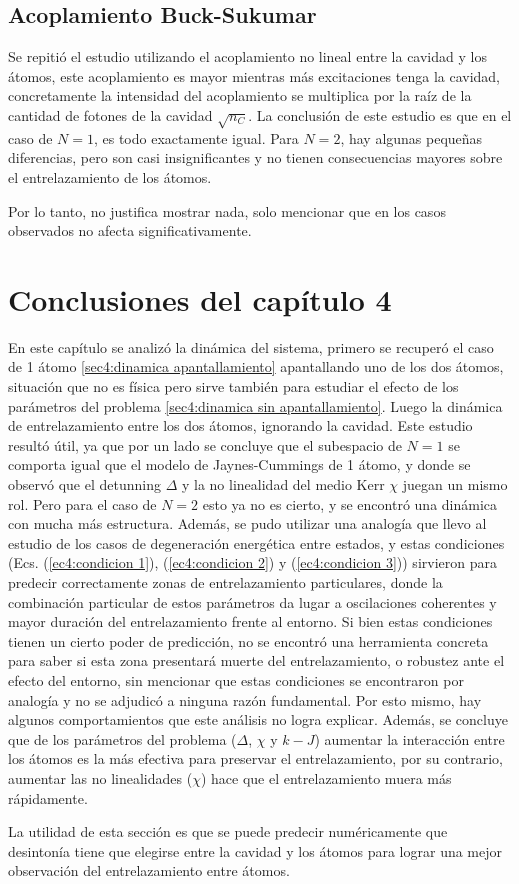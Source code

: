 \subsection{Acoplamiento Buck-Sukumar}
Se repitió el estudio utilizando el acoplamiento no lineal entre la cavidad y los átomos, este acoplamiento es mayor mientras más excitaciones tenga la cavidad, concretamente la intensidad del acoplamiento se multiplica por la raíz de la cantidad de fotones de la cavidad $\sqrt{n_C}$. 
La conclusión de este estudio es que en el caso de $N=1$, es todo exactamente igual. Para $N=2$, hay algunas pequeñas diferencias, pero son casi insignificantes y no tienen consecuencias mayores sobre el entrelazamiento de los átomos. 

Por lo tanto, no justifica mostrar nada, solo mencionar que en los casos observados no afecta significativamente.

\section{Conclusiones del capítulo 4}
En este capítulo se analizó la dinámica del sistema, primero se recuperó el caso de 1 átomo \ref{sec4:dinamica apantallamiento} apantallando uno de los dos átomos, situación que no es física pero sirve también para estudiar el efecto de los parámetros del problema \ref{sec4:dinamica sin apantallamiento}. Luego la dinámica de entrelazamiento entre los dos átomos, ignorando la cavidad. Este estudio resultó útil, ya que por un lado se concluye que el subespacio de $N=1$ se comporta igual que el modelo de Jaynes-Cummings de 1 átomo, y donde se observó que el detunning $\Delta$ y la no linealidad del medio Kerr $\chi$ juegan un mismo rol. Pero para el caso de $N=2$ esto ya no es cierto, y se encontró una dinámica con mucha más estructura. Además, se pudo utilizar una analogía que llevo al estudio de los casos de degeneración energética entre estados, y estas condiciones (Ecs. (\ref{ec4:condicion 1}), (\ref{ec4:condicion 2}) y (\ref{ec4:condicion 3})) sirvieron para predecir correctamente zonas de entrelazamiento particulares, donde la combinación particular de estos parámetros da lugar a oscilaciones coherentes y mayor duración del entrelazamiento frente al entorno. Si bien estas condiciones tienen un cierto poder de predicción, no se encontró una herramienta concreta para saber si esta zona presentará muerte del entrelazamiento, o robustez ante el efecto del entorno, sin mencionar que estas condiciones se encontraron por analogía y no se adjudicó a ninguna razón fundamental. Por esto mismo, hay algunos comportamientos que este análisis no logra explicar. Además, se concluye que de los parámetros del problema ($\Delta$, $\chi$ y $k-J$) aumentar la interacción entre los átomos es la más efectiva para preservar el entrelazamiento, por su contrario, aumentar las no linealidades ($\chi$) hace que el entrelazamiento muera más rápidamente.

La utilidad de esta sección es que se puede predecir numéricamente que desintonía tiene que elegirse entre la cavidad y los átomos para lograr una mejor observación del entrelazamiento entre átomos.
